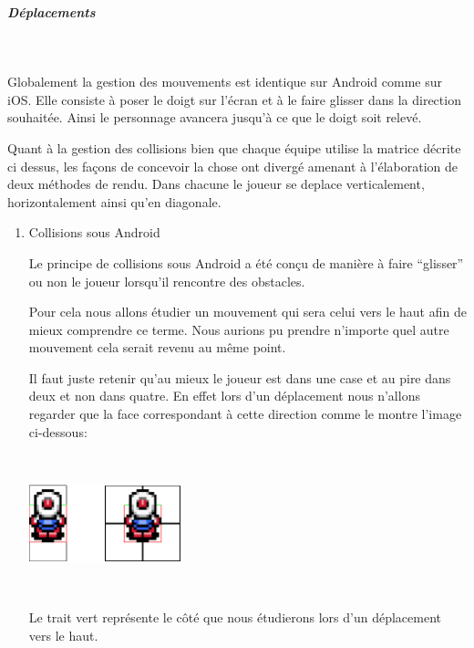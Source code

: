 			\subparagraph{Déplacements\\}
			
				$\,$
			
				Globalement la gestion des mouvements est identique sur Android comme sur
				iOS.
				Elle consiste à poser le doigt sur l'écran et à le faire glisser dans la
				direction souhaitée. Ainsi le personnage avancera jusqu'à ce que le doigt
				soit relevé.				
				
				Quant à la gestion des collisions bien que chaque équipe utilise la matrice
				décrite ci dessus, les façons de concevoir la chose ont divergé amenant à
				l'élaboration de deux méthodes de rendu. Dans chacune le joueur se deplace
				verticalement, horizontalement ainsi qu'en diagonale.
				
				\begin{enumerate}
				  \item Collisions sous Android
				  
				  		Le principe de collisions sous Android a été conçu de manière à faire
				  		``glisser'' ou non le joueur lorsqu'il rencontre des obstacles.
				  		
				  		
				  		Pour cela nous allons étudier un mouvement qui sera celui vers le haut
				  		afin de mieux comprendre ce terme.
				  		Nous aurions pu prendre n'importe quel autre mouvement cela serait
				  		revenu au même point.
				  		
				  		Il faut juste retenir qu'au mieux le joueur est dans une case et au pire
				  		dans deux et non dans quatre. En effet lors d'un déplacement nous
				  		n'allons regarder que la face correspondant à cette direction comme le montre
				  		l'image ci-dessous:
				  		
				  		$\,$
				  		
						\begin{center}						
							\includegraphics[width=168px,height=84px]{Developpement/Img/ex2.eps}
						\end{center}
						
				  		$\,$				  		
				  		
				  		Le trait vert représente le côté que nous étudierons lors d'un
				  		déplacement vers le haut.
				  		

\end{enumerate}
